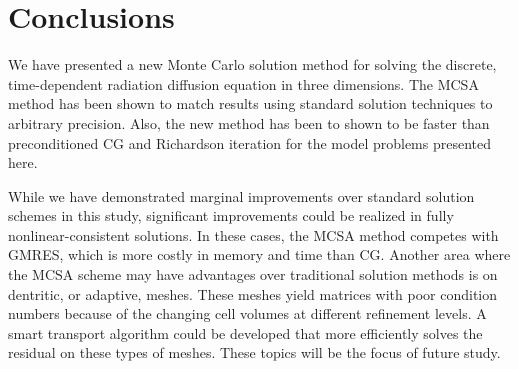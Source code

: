 \documentclass[preprint,12pt]{elsarticle}
\begin{document}
\section{Conclusions}
\label{sec:conclusions}

We have presented a new Monte Carlo solution method for solving the discrete,
time-dependent radiation diffusion equation in three dimensions.  The MCSA
method has been shown to match results using standard solution techniques to
arbitrary precision. Also, the new method has been to shown to be faster than
preconditioned CG and Richardson iteration for the model problems presented
here.

While we have demonstrated marginal improvements over standard solution
schemes in this study, significant improvements could be realized in fully
nonlinear-consistent solutions.  In these cases, the MCSA method competes with
GMRES, which is more costly in memory and time than CG.  Another area where
the MCSA scheme may have advantages over traditional solution methods is on
dentritic, or adaptive, meshes.  These meshes yield matrices with poor
condition numbers because of the changing cell volumes at different refinement
levels.  A smart transport algorithm could be developed that more efficiently
solves the residual on these types of meshes.  These topics will be the focus
of future study.





 








\end{document}
